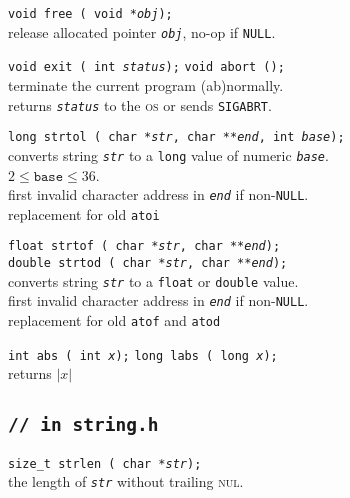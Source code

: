 \documentclass[8pt]{article}
\newcommand{\Cc}[1]{\texttt{#1}}
\newcommand{\cmt}[1]{\textcolor[gray]{.3}{\texttt{#1}}} %
\newcommand{\ty}[1]{\textcolor{blue!80}{\texttt{#1}}} %
\newcommand{\kv}[1]{\textcolor{red!40!black}{\texttt{#1}}} %
\newcommand{\fn}[1]{\texttt{#1}} %
\newcommand{\var}[1]{\texttt{\textit{#1}}} %
\newcommand{\htab}{\hspace*{2em}} %
\begin{document}
\begin{multicols}{3}
\Cc{\ty{void} \fn{free}\,(%
    \ty{void *}\var{obj});} \\
\htab release allocated pointer \var{obj}, no-op if \kv{NULL}.

\Cc{\ty{void} \fn{exit}\,(%
    \ty{int} \var{status});} \hfill
\Cc{\ty{void} \fn{abort}\,();} \\
\htab terminate the current program (ab)normally. \\
\htab returns \var{status} to the \textsc{os} or sends \kv{SIGABRT}.

\Cc{\ty{long} \fn{strtol}\,(%
    \ty{char *}\var{str}, %
    \ty{char **}\var{end}, %
    \ty{int} \var{base});}\\
\htab converts string \var{str} to a \ty{long} value of numeric \var{base}. \\
\htab $2\le\texttt{base}\le36$. \\
\htab first invalid character address in \var{end} if non-\kv{NULL}. \\
\htab replacement for old \fn{atoi}

\Cc{\ty{float} \fn{strtof}\,(%
    \ty{char *}\var{str}, %
    \ty{char **}\var{end});}\\
\Cc{\ty{double} \fn{strtod}\,(%
    \ty{char *}\var{str}, %
    \ty{char **}\var{end});}\\
\htab converts string \var{str} to a \ty{float} or \ty{double} value. \\
\htab first invalid character address in \var{end} if non-\kv{NULL}. \\
\htab replacement for old \fn{atof} and \fn{atod}

\Cc{\ty{int} \fn{abs}\,(%
    \ty{int} \var{x});} \hfill
\Cc{\ty{long} \fn{labs}\,(%
    \ty{long} \var{x});} \\
\htab returns $\left|x\right|$


\subsection*{\Cc{\cmt{// in string.h}}}

\Cc{\ty{size\_t} \fn{strlen}\,(%
    \ty{char *}\var{str});} \\
\htab the length of \var{str} without trailing \textsc{nul}.


\end{multicols}
\end{document}
